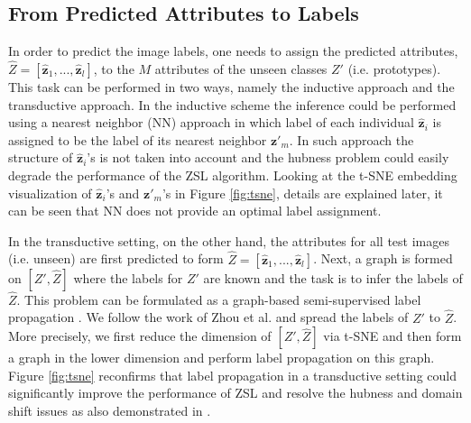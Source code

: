 \documentclass[letterpaper]{article} %
\def\z{\mathbf{z}}
\begin{document}
 
 


 
 









\subsection{From Predicted Attributes to Labels}

In order to predict the image labels, one needs to assign the predicted attributes, $\hat{Z}=[\hat{\z}_1,...,\hat{\z}_l]$, to the $M$ attributes of the unseen classes $Z'$ (i.e. prototypes). This task can be performed in two ways, namely the inductive approach and the transductive approach. In the inductive scheme the inference could be performed using a nearest neighbor (NN) approach in which label of each individual $\hat{\z}_i$ is assigned to be the label of its nearest neighbor $\z'_m$. In such approach the structure of $\hat{\z}_i$'s is not taken into account and the hubness problem could easily degrade the performance of the ZSL algorithm. Looking at the t-SNE embedding  visualization \cite{maaten2008visualizing} of $\hat{\z}_i$'s and $\z'_m$'s in Figure \ref{fig:tsne}, details are explained later, it can be seen that NN does not provide an optimal label assignment. 

In the transductive setting, on the other hand, the attributes for all test images (i.e. unseen) are first predicted to form $\hat{Z}=[\hat{\z}_1,...,\hat{\z}_l]$. Next, a graph is formed on $[Z',\hat{Z}]$ where the labels for $Z'$ are known and the task is to infer the labels of $\hat{Z}$. This problem can be formulated as a graph-based semi-supervised label propagation \cite{belkin2004regularization,zhou2003learning}. We follow the work of Zhou et al. \cite{zhou2003learning} and spread the labels of $Z'$ to $\hat{Z}$. More precisely,  we first reduce the dimension of $[Z',\hat{Z}]$ via t-SNE \cite{maaten2008visualizing} and then form a graph in the lower dimension and perform label propagation on this graph. Figure \ref{fig:tsne} reconfirms that label propagation in a transductive setting could significantly improve the performance of ZSL and resolve the hubness and domain shift issues as also demonstrated in \cite{fu2015transductive,yu2017transductive}. 
\end{document}
